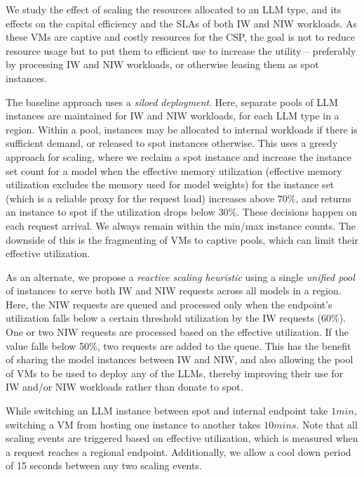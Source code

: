 We study the effect of scaling the resources allocated to an LLM type, and its effects on the capital efficiency and the SLAs of both IW and NIW workloads. As these VMs are captive and costly resources for the CSP, the goal is not to reduce resource usage but to put them to efficient use to increase the utility -- preferably by processing IW and NIW workloads, or otherwise leasing them as spot instances.

The baseline approach uses a \textit{siloed deployment}. Here, separate pools of LLM instances are maintained for IW and NIW workloads, for each LLM type in a region. Within a pool, instances may be allocated to internal workloads if there is sufficient demand, or released to spot instances otherwise.
This uses a greedy approach for scaling, where we reclaim a spot instance and increase the instance set count for a model when the effective memory utilization (effective memory utilization excludes the memory used for model weights) for the instance set (which is a reliable proxy for the request load) increases above $70\%$, and returns an instance to spot if the utilization drops below $30\%$. These decisions happen on each request arrival. We always remain within the min/max instance counts.
The downside of this is the fragmenting of VMs to captive pools, which can limit their effective utilization.

As an alternate, we propose a \textit{reactive scaling heuristic} using a single \textit{unified pool} of instances to serve both IW and NIW requests across all models in a region. 
Here, the NIW requests are queued and processed only when the endpoint's utilization falls below a certain threshold utilization by the IW requests (60\%). One or two NIW requests are processed based on the effective utilization. If the value falls below 50\%, two requests are added to the queue.
This has the benefit of sharing the model instances between IW and NIW, and also allowing the pool of VMs to be used to deploy any of the LLMs, thereby improving their use for IW and/or NIW workloads rather than donate to spot.

While switching an LLM instance between spot and internal endpoint take $1min$, switching a VM from hosting one instance to another takes $10mins$. Note that all scaling events are triggered based on effective utilization, which is measured when a request reaches a regional endpoint. Additionally, we allow a cool down period of 15 seconds between any two scaling events.


